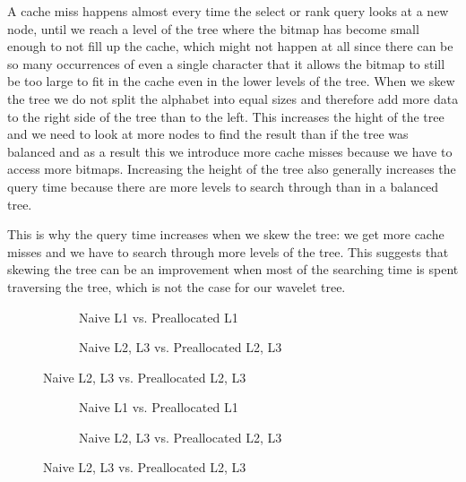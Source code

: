 A cache miss happens almost every time the select or rank query looks at a new node, until we reach a level of the tree where the bitmap has become small enough to not fill up the cache, which might not happen at all since there can be so many occurrences of even a single character that it allows the bitmap to still be too large to fit in the cache even in the lower levels of the tree.
When we skew the tree we do not split the alphabet into equal sizes and therefore add more data to the right side of the tree than to the left. 
This increases the hight of the tree and we need to look at more nodes to find the result than if the tree was balanced and as a result this we introduce more cache misses because we have to access more bitmaps.
Increasing the height of the tree also generally increases the query time because there are more levels to search through than in a balanced tree.

This is why the query time increases when we skew the tree: we get more cache misses and we have to search through more levels of the tree. 
This suggests that skewing the tree can be an improvement when most of the searching time is spent traversing the tree, which is not the case for our wavelet tree.

\begin{figure}
\caption{Rank Cache Misses on Wavelet Tree with increasing skew}
\label{fig:NaivePreallocatedRankSkewCacheMisses}
\centering
\begin{subfigure}{\textwidth}
	\caption{Naive L1 vs. Preallocated L1}
	\label{fig:L1NaivePreallocatedRankSkewCacheMisses}
	
	\vspace*{5 mm}
\end{subfigure}
\begin{subfigure}{\textwidth}
	\caption{Naive L2, L3 vs. Preallocated L2, L3}
	\label{fig:L2L3NaivePreallocatedRankSkewCacheMisses}
 	
\end{subfigure}
\end{figure}

\begin{figure}
\caption{Select Cache Misses on Wavelet Tree with increasing skew}
\label{fig:NaivePreallocatedSelectSkewCacheMisses}
\centering
\begin{subfigure}{\textwidth}
	\caption{Naive L1 vs. Preallocated L1}
	\label{fig:L1NaivePreallocatedSelectSkewCacheMisses}
	
	\vspace*{5 mm}
\end{subfigure}
\begin{subfigure}{\textwidth}
	\caption{Naive L2, L3 vs. Preallocated L2, L3}
	\label{fig:L2L3NaivePreallocatedSelectSkewCacheMisses}
 	
\end{subfigure}
\end{figure}



